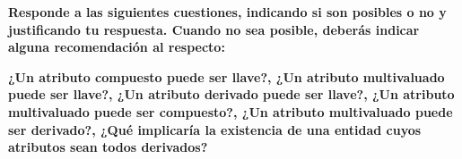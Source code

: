 \begin{center}
    \textbf{Responde a las siguientes cuestiones, indicando si son posibles o no y justificando tu respuesta. Cuando no sea posible, deberás indicar alguna recomendación al respecto:} 

\vspace{.3cm}

    \textbf{¿Un atributo compuesto puede ser llave?, ¿Un atributo multivaluado puede ser llave?, ¿Un atributo derivado puede ser llave?, ¿Un atributo multivaluado puede ser compuesto?, ¿Un atributo multivaluado puede ser derivado?, ¿Qué implicaría la existencia de una entidad cuyos atributos sean todos derivados?} 
\end{center}

\vspace{.3cm}


